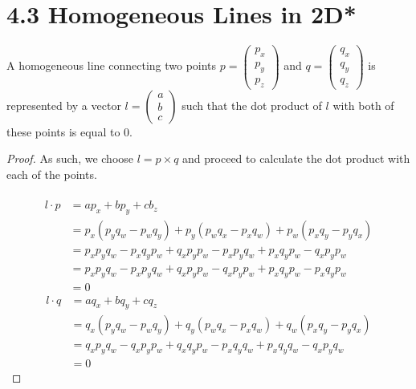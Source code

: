 \documentclass{article}
\begin{document}
\newpage
\section*{4.3 Homogeneous Lines in 2D*} \label{ex3}
 
    A homogeneous line connecting two points $p=\left( \begin{matrix} p_x\\ p_y\\ p_z\end{matrix}\right)$ and $q=\left( \begin{matrix} q_x\\ q_y\\ q_z\end{matrix}\right)$ is represented by a vector $l=\left( \begin{matrix} a\\ b\\ c\end{matrix}\right)$ such that the dot product of $l$ with both of these points is equal to 0.\\
    \begin{proof}
        As such, we choose $l=p \times q$ and proceed to calculate the dot product with each of the points.\\\\
        \begin{align}
            l \cdot p &= a p_x + b p_y + cb_z\\
            &= p_x(p_y q_w - p_w q_y) + p_y(p_w q_x - p_x q_w) + p_w(p_x q_y - p_y q_x)\\
            &= p_x p_y q_w - p_x q_y p_w + q_x p_y p_w - p_x p_y q_w + p_x q_y p_w - q_x p_y p_w\\
            &= p_x p_y q_w - p_x p_y q_w + q_x p_y p_w - q_x p_y p_w + p_x q_y p_w - p_x q_y p_w\\
            &= 0
        \end{align}
        \begin{align}
            l \cdot q &= a q_x + b q_y + c q_z\\
            &= q_x (p_y q_w - p_w q_y) + q_y (p_w q_x - p_x q_w) + q_w (p_x q_y - p_y q_x)\\
            &= q_x p_y q_w - q_x p_y p_w + q_x q_y p_w - p_x q_y q_w + p_x q_y q_w - q_x p_y q_w\\
            &= 0
        \end{align}
    \end{proof}
    
    
    
    
\end{document}
